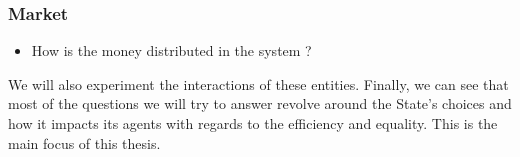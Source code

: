 \subsubsection{Market}

\begin{itemize}
    \item How is the money distributed in the system ? 
\end{itemize}



\noindent We will also experiment the interactions of these entities. Finally, we can see that most of the questions we will try to answer revolve around the State's choices and how it impacts its agents with regards to the efficiency and equality. This is the main focus of this thesis.
